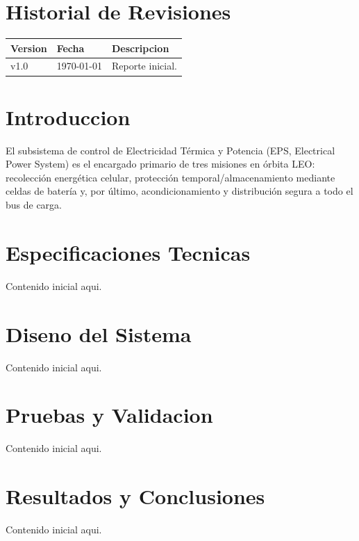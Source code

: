 \documentclass[a4paper, twoside, 12pt]{report}
\begin{document}

\begin{abstract}
    Escribe aqui el resumen ejecutivo del reporte.
\end{abstract}

\chapter*{Historial de Revisiones}
\begin{center}
\begin{tabular}{p{2cm} p{3cm} p{9cm}}
\toprule
\textbf{Version} & \textbf{Fecha} & \textbf{Descripcion} \\
\midrule
v1.0 & \today & Reporte inicial. \\
\bottomrule
\end{tabular}
\end{center}

\clearpage
\tableofcontents
\listoffigures
\listoftables
\clearpage


\chapter{Introduccion}
El subsistema de control de Electricidad Térmica y Potencia (EPS, Electrical Power System) es el encargado primario de tres misiones en órbita LEO: recolección energética celular, protección temporal/almacenamiento mediante celdas de batería y, por último, acondicionamiento y distribución segura a todo el bus de carga.

\chapter{Especificaciones Tecnicas}
Contenido inicial aqui.

\chapter{Diseno del Sistema}
Contenido inicial aqui.

\chapter{Pruebas y Validacion}
Contenido inicial aqui.

\chapter{Resultados y Conclusiones}
Contenido inicial aqui.

% 
% 
\end{document}
